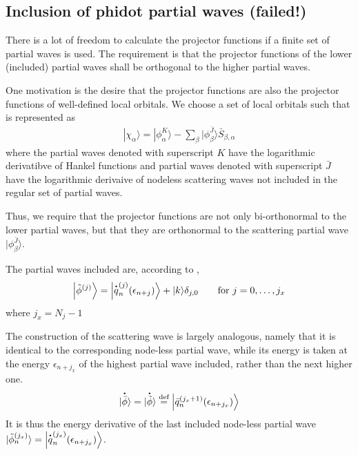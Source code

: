 \documentclass[11pt,a4paper]{report}
\begin{document}
\subsection{Inclusion of phidot partial waves (failed!)}


There is a lot of freedom to calculate the projector functions if a
finite set of partial waves is used. The requirement is that the
projector functions of the lower (included) partial waves shall be
orthogonal to the higher partial waves.

One motivation is the desire that the projector functions are also the
projector functions of well-defined local orbitals. We choose a set of
local orbitals such that is represented as
\begin{eqnarray}
|\chi_\alpha\rangle=|\phi_\alpha^K\rangle-\sum_\beta |\phi_\beta^{\bar{J}}\rangle
\bar{S}_{\beta,\alpha}
\end{eqnarray}
where the partial waves denoted with superscript $K$ have the
logarithmic derivatibve of Hankel functions and partial waves denoted
with superscript $\bar{J}$ have the logarithmic derivaive of nodeless
scattering waves not included in the regular set of partial waves.

Thus, we require that the projector functions are not only
bi-orthonormal to the lower partial waves, but that they are
orthonormal to the scattering partial wave $|\phi_\beta^{\bar{J}}\rangle$.

The partial waves included are, according to
,
\begin{eqnarray}
\Bigl|\tilde{\phi}^{(j)}\Bigr\rangle
=\Bigl|\dot{q}_n^{(j)}(\epsilon_{n+j})\Bigr\rangle+|k\rangle\delta_{j,0}
\qquad\text{for $j=0,\ldots,j_x$}
\end{eqnarray}
where $j_x=N_j-1$


The construction of the scattering wave is largely analogous, namely
that it is identical to the corresponding node-less partial wave,
while its energy is taken at the energy $\epsilon_{n+j_x}$ of the
highest partial wave included, rather than the next higher one.
\begin{eqnarray}
|\dot{\bar{\phi}}\rangle=|\dot{\tilde{\phi}}\rangle
\defas
\Bigl|\bar{q}_n^{(j_x+1)}(\epsilon_{n+j_x})\Bigr\rangle
\end{eqnarray}
It is thus the energy derivative of the last included node-less
partial wave $|\tilde{\phi}^{(j_x)}_n\rangle=
\Bigl|\dot{q}_n^{(j_x)}(\epsilon_{n+j_x})\Bigr\rangle$.
\end{document}
